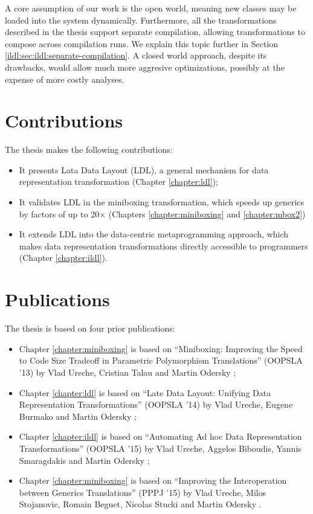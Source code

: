 A core assumption of our work is the open world, meaning new classes may be loaded into the system dynamically. Furthermore, all the transformations described in the thesis support separate compilation, allowing transformations to compose across compilation runs. We explain this topic further in Section \ref{ildl:sec:ildl:separate-compilation}. A closed world approach, despite its drawbacks, would allow much more aggresive optimizations, possibly at the expense of more costly analyses.

\newpage

\section{Contributions}

The thesis makes the following contributions:

\begin{itemize}
  \item It presents Lata Data Layout (LDL), a general mechanism for data representation transformation (Chapter \ref{chapter:ldl});
  \item It validates LDL in the miniboxing transformation, which speeds up generics by factors of up to 20$\times$ (Chapters \ref{chapter:miniboxing} and \ref{chapter:mbox2})
  \item It extends LDL into the data-centric metaprogramming approach, which makes data representation transformations directly accessible to programmers (Chapter \ref{chapter:ildl}).
\end{itemize}

\section{Publications}

The thesis is based on four prior publications:

\begin{itemize}
  \item Chapter \ref{chapter:miniboxing} is based on ``Miniboxing: Improving the Speed to Code Size Tradeoff in Parametric Polymorphism Translations'' (OOPSLA '13) by Vlad Ureche, Cristian Talau and Martin Odersky \cite{miniboxing};
  \item Chapter \ref{chapter:ldl} is based on ``Late Data Layout: Unifying Data Representation Transformations'' (OOPSLA '14) by Vlad Ureche, Eugene Burmako and Martin Odersky \cite{ldl};
  \item Chapter \ref{chapter:ildl} is based on ``Automating Ad hoc Data Representation Transformations'' (OOPSLA '15) by Vlad Ureche, Aggelos Biboudis, Yannis Smaragdakis and Martin Odersky \cite{ildl-tech};
  \item Chapter \ref{chapter:miniboxing} is based on ``Improving the Interoperation between Generics Translations'' (PPPJ '15) by Vlad Ureche, Milos Stojanovic, Romain Beguet, Nicolas Stucki and Martin Odersky \cite{miniboxing-pppj}.
\end{itemize}

